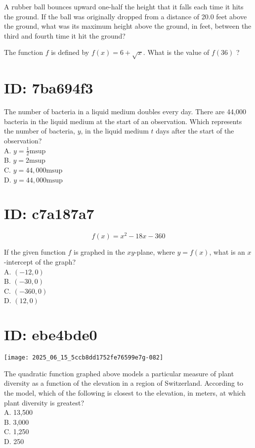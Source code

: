 A rubber ball bounces upward one-half the height that it falls each time it hits the ground. If the ball was originally dropped from a distance of 20.0 feet above the ground, what was its maximum height above the ground, in feet, between the third and fourth time it hit the ground?

The function $f$ is defined by $f(x)=6+\sqrt{x}$. What is the value of $f(36)$ ?

\section*{ID: 7ba694f3}
The number of bacteria in a liquid medium doubles every day. There are 44,000 bacteria in the liquid medium at the start of an observation. Which represents the number of bacteria, $y$, in the liquid medium $t$ days after the start of the observation?\\
A. $y=\frac{1}{2} \mathrm{msup}$\\
B. $y=2 \mathrm{msup}$\\
C. $y=44,000 \mathrm{msup}$\\
D. $y=44,000 \mathrm{msup}$

\section*{ID: c7a187a7}
$$
f(x)=x^{2}-18 x-360
$$

If the given function $f$ is graphed in the $x y$-plane, where $y=f(x)$, what is an $x$-intercept of the graph?\\
A. $(-12,0)$\\
B. $(-30,0)$\\
C. $(-360,0)$\\
D. $(12,0)$

\section*{ID: ebe4bde0}
\begin{center}
\texttt{[image: 2025\_06\_15\_5ccb8dd1752fe76599e7g-082]}
\end{center}

The quadratic function graphed above models a particular measure of plant diversity as a function of the elevation in a region of Switzerland. According to the model, which of the following is closest to the elevation, in meters, at which plant diversity is greatest?\\
A. 13,500\\
B. 3,000\\
C. 1,250\\
D. 250

